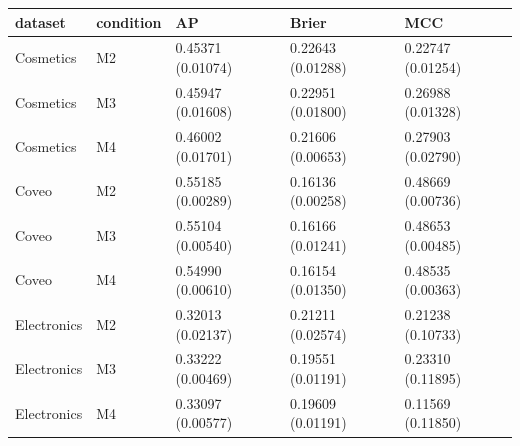 \begin{tabular}{lllll}
\toprule
dataset & condition & AP & Brier & MCC \\
\midrule
Cosmetics & M2 & 0.45371 (0.01074) & 0.22643 (0.01288) & 0.22747 (0.01254) \\
Cosmetics & M3 & 0.45947 (0.01608) & 0.22951 (0.01800) & 0.26988 (0.01328) \\
Cosmetics & M4 & 0.46002 (0.01701) & 0.21606 (0.00653) & 0.27903 (0.02790) \\
Coveo & M2 & 0.55185 (0.00289) & 0.16136 (0.00258) & 0.48669 (0.00736) \\
Coveo & M3 & 0.55104 (0.00540) & 0.16166 (0.01241) & 0.48653 (0.00485) \\
Coveo & M4 & 0.54990 (0.00610) & 0.16154 (0.01350) & 0.48535 (0.00363) \\
Electronics & M2 & 0.32013 (0.02137) & 0.21211 (0.02574) & 0.21238 (0.10733) \\
Electronics & M3 & 0.33222 (0.00469) & 0.19551 (0.01191) & 0.23310 (0.11895) \\
Electronics & M4 & 0.33097 (0.00577) & 0.19609 (0.01191) & 0.11569 (0.11850) \\
\bottomrule
\end{tabular}
